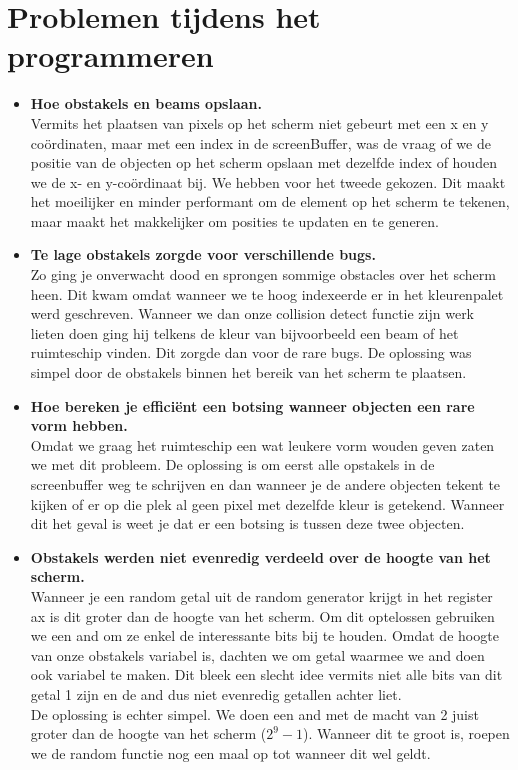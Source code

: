 \documentclass{article}
\begin{document}
\section{Problemen tijdens het programmeren}\label{problems}
\begin {itemize}

\item \textbf{Hoe obstakels en beams opslaan.}\\
Vermits het plaatsen van pixels op het scherm niet gebeurt met een x en y co\"{o}rdinaten, maar met een index in de screenBuffer, was de vraag of we de positie van de objecten op het scherm opslaan met dezelfde index of houden we de x- en y-co\"{o}rdinaat bij. We hebben voor het tweede gekozen. Dit maakt het moeilijker en minder performant om de element op het scherm te tekenen, maar maakt het makkelijker om posities te updaten en te generen.

\item \textbf{Te lage obstakels zorgde voor verschillende bugs.}\\
Zo ging je onverwacht dood en sprongen sommige obstacles over het scherm heen. Dit kwam omdat wanneer we te hoog indexeerde er in het kleurenpalet werd geschreven. Wanneer we dan onze collision detect functie zijn werk lieten doen ging hij telkens de kleur van bijvoorbeeld een beam of het ruimteschip vinden. Dit zorgde dan voor de rare bugs. De oplossing was simpel door de obstakels binnen het bereik van het scherm te plaatsen.

\item \textbf{Hoe bereken je effici\"{e}nt een botsing wanneer objecten een rare vorm hebben.}\\
Omdat we graag het ruimteschip een wat leukere vorm wouden geven zaten we met dit probleem. De oplossing is om eerst alle opstakels in de screenbuffer weg te schrijven en dan wanneer je de andere objecten tekent te kijken of er op die plek al geen pixel met dezelfde kleur is getekend. Wanneer dit het geval is weet je dat er een botsing is tussen deze twee objecten.

\item \textbf{Obstakels werden niet evenredig verdeeld over de hoogte van het scherm.}\\
Wanneer je een random getal uit de random generator krijgt in het register ax is dit groter dan de hoogte van het scherm. Om dit optelossen gebruiken we een and om ze enkel de interessante bits bij te houden. Omdat de hoogte van onze obstakels variabel is, dachten we om getal waarmee we and doen ook variabel te maken. Dit bleek een slecht idee vermits niet alle bits van dit getal 1 zijn en de and dus niet evenredig getallen achter liet.\\
De oplossing is echter simpel. We doen een and met de macht van 2 juist groter dan de hoogte van het scherm (\(2^9 - 1\)). Wanneer dit te groot is, roepen we de random functie nog een maal op tot wanneer dit wel geldt. 


\end {itemize}
\end{document}
